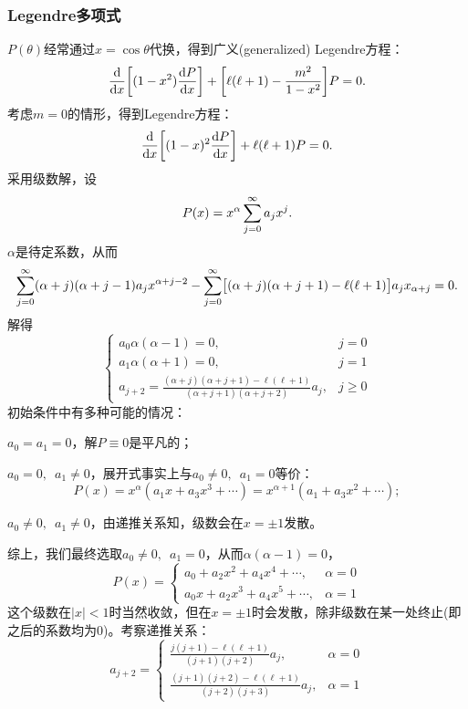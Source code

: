 \subsubsection{Legendre多项式}
$P(\theta)$经常通过$x=\cos\theta$代换，得到广义(generalized) Legendre方程：
\begin{equation}
    \label{eqn:general Legendre}
    \dd x\biggfkh{(1-x^2)\dv Px}+\biggfkh{\ell(\ell+1)-\frac{m^2}{1-x^2}}P=0.
\end{equation}
考虑$m=0$的情形，得到Legendre方程：
\begin{equation}
    \label{eqn:Legendre}
    \dd x\biggfkh{(1-x)^2\dv Px}+\ell(\ell+1)P=0.
\end{equation}
采用级数解，设
\[
    P(x)=x^\alpha\sum_{j=0}^{\infty} a_jx^j.
\]
$\alpha$是待定系数，从而 
\[
    \sum_{j=0}^{\infty}(\alpha+j)(\alpha+j-1)a_j x^{\alpha+j-2}-\sum_{j=0}^{\infty}\bigl[(\alpha+j)(\alpha+j+1)-\ell(\ell+1)\bigr]a_jx_{\alpha+j}=0.
\]
解得
\[
    \begin{cases}
        a_0\alpha(\alpha-1)=0,&j=0\\
        a_1\alpha(\alpha+1)=0,&j=1\\
        a_{j+2}=\frac{(\alpha+j)(\alpha+j+1)-\ell(\ell+1)}{(\alpha+j+1)(\alpha+j+2)}a_j,&j\geqslant 0
    \end{cases}
\]
初始条件中有多种可能的情况：
\begin{compactitem}
	\item $a_0=a_1=0$，解$P\equiv 0$是平凡的；
	\item $a_0=0,\enspace a_1\neq 0$，展开式事实上与$a_0\neq 0,\enspace a_1=0$等价：
	\[
        P(x)=x^\alpha(a_1x+a_3x^3+\cdots)=x^{\alpha+1}(a_1+a_3x^2+\cdots);
    \]
	\item $a_0\neq 0,\enspace a_1\neq 0$，由递推关系知，级数会在$x=\pm 1$发散。
\end{compactitem}
综上，我们最终选取$a_0\neq 0,\enspace a_1=0$，从而$\alpha(\alpha-1)=0$，
\[
    P(x)=\begin{cases}
        a_0+a_2x^2+a_4x^4+\cdots,&\alpha=0\\
        a_0x+a_2x^3+a_4x^5+\cdots,&\alpha=1
    \end{cases}
\]
这个级数在$|x|<1$时当然收敛，但在$x=\pm 1$时会发散，除非级数在某一处终止(即之后的系数均为0)。考察递推关系：
\[
    a_{j+2}=\begin{cases}
        \frac{j(j+1)-\ell(\ell+1)}{(j+1)(j+2)}a_j,&\alpha=0\\[2ex]
        \frac{(j+1)(j+2)-\ell(\ell+1)}{(j+2)(j+3)}a_j,&\alpha=1
    \end{cases}
\]
